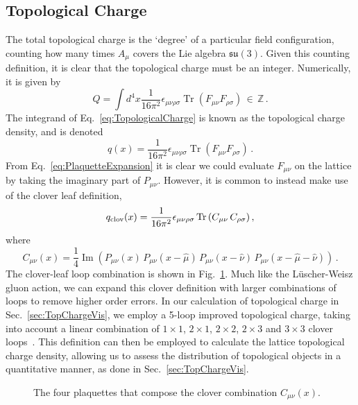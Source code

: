 \subsection{Topological Charge}\label{sec:TopQ}
The total topological charge is the `degree' of a particular field configuration, counting how many times $A_\mu$ covers the Lie algebra $\mathfrak{su}(3)$. Given this counting definition, it is clear that the topological charge must be an integer. Numerically, it is given by~\cite{Alexandrou:2017hqw}
%
\begin{equation}
Q = \int d^4x \frac { 1 } { 16 \pi ^ { 2 } } \epsilon _ { \mu \nu \rho \sigma } \operatorname { Tr } \left( F _ { \mu \nu } F _ { \rho \sigma } \right)\, \in\, \mathbb{Z} \, .
\label{eq:TopologicalCharge}
\end{equation} 
The integrand of Eq.~\ref{eq:TopologicalCharge} is known as the topological charge density, and is denoted
%
\begin{equation}
q(x) = \frac { 1 } { 16 \pi ^ { 2 } } \epsilon _ { \mu \nu \rho \sigma } \operatorname { Tr } \left( F _ { \mu \nu } F _ { \rho \sigma } \right)\, .
\end{equation}
%
From Eq.~\ref{eq:PlaquetteExpansion} it is clear we could evaluate $F_{\mu\nu}$ on the lattice by taking the imaginary part of $P_{\mu\nu}$. However, it is common to instead make use of the clover leaf definition,
%
\begin{equation}
q_\text{clov}(x) = \frac{1}{16\pi^2} \epsilon _ { \mu \nu \rho \sigma } \operatorname{Tr}\left(C_{\mu\nu} \, C_{\rho\sigma}\right),
\end{equation}
%
where
\begin{equation}
C_{\mu\nu}(x) = \frac{1}{4} \operatorname{Im}\left(P_{\mu\nu}(x) \, P_{\mu\nu}(x-\hat{\mu}) \, P_{\mu\nu}(x - \hat{\nu}) \, P_{\mu\nu}(x - \hat{\mu} - \hat{\nu})\right)\, .
\end{equation}
%
The clover-leaf loop combination is shown in Fig.~\ref{fig:Clover}. Much like the L\"uscher-Weisz gluon action, we can expand this clover definition with larger combinations of loops to remove higher order errors. In our calculation of topological charge in Sec.~\ref{sec:TopChargeVis}, we employ a 5-loop improved topological charge, taking into account a linear combination of $1\times 1$, $2\times 1$, $2\times 2$, $2\times 3$ and $3\times 3$ clover loops~\cite{BilsonThompson:2001ca}. This definition can then be employed to calculate the lattice topological charge density, allowing us to assess the distribution of topological objects in a quantitative manner, as done in Sec.~\ref{sec:TopChargeVis}.
%
\begin{figure}[H]
\centering
\scalebox{0.9}{}
\caption{\label{fig:Clover}The four plaquettes that compose the clover combination $C_{\mu\nu}(x)$.}
\end{figure}
%

